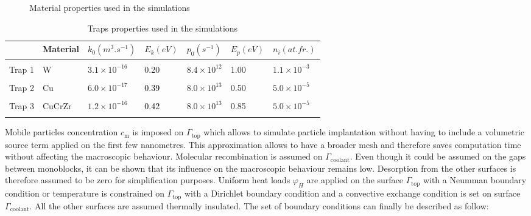 \begin{figure} [h!]
\begin{subfigure}{0.5\linewidth}
        \label{fig:D coeff}
    \end{subfigure}
    \caption{Material properties used in the simulations \cite{reiter_compilation_1996, serra_hydrogen_1998, fernandez_hydrogen_2015}}
    \label{fig:properties}
\end{figure}

\begin{table} [ht]
    \centering
    \begin{tabular}{L{1.5cm} L{1.5cm} R{1.6cm} R{1.1cm} R{1.6cm} R{1.1cm} R{2cm}}
         & Material & $k_0 (\si{m^3.s^{-1}})$ &  $E_k (\si{eV})$ & $p_0 (\si{s^{-1}})$ & $E_p (\si{eV})$ & $n_i (\si{at.fr.})$ \\
        \hline
        \\
       Trap 1 & W & $3.1 \times 10^{-16}$ & 0.20 & $8.4 \times 10^{12}$& 1.00 & $1.1 \times 10^{-3}$ \\
        \\
        Trap 2 & Cu & $6.0 \times 10^{-17}$ & \textcolor{black}{0.39} & $8.0 \times 10^{13}$ & 0.50 &$5.0 \times 10^{-5}$\\
        \\
        Trap 3 & CuCrZr & $1.2 \times 10^{-16}$ & \textcolor{black}{0.42} & $8.0 \times 10^{13}$ & 0.85 &$5.0 \times 10^{-5}$\\
        \\
    \end{tabular}
    \caption{Traps properties used in the simulations \cite{hodille_macroscopic_2015, dolan_assessment_1994}}
    \label{tab:traps monoblock}
\end{table}


Mobile particles concentration $c_\mathrm{m}$ is imposed on $\Gamma_\mathrm{top}$ which allows to simulate particle implantation without having to include a volumetric source term applied on the first few nanometres.
This approximation allows to have a broader mesh and therefore saves computation time without affecting the macroscopic behaviour.
Molecular recombination is assumed on $\Gamma_\mathrm{coolant}$.
Even though it could be assumed on the gaps between monoblocks, it can be shown that its influence on the macroscopic behaviour remains low.
Desorption from the other surfaces is therefore assumed to be zero for simplification purposes.
\textcolor{black}{Uniform} heat loads $\varphi_H$ are applied on the surface $\Gamma_\mathrm{top}$ with a Neumman boundary condition or temperature is constrained on $\Gamma_\mathrm{top}$ with a Dirichlet boundary condition and a convective exchange condition is set on surface $\Gamma_\mathrm{coolant}$.
All the other surfaces are assumed thermally insulated.
The set of boundary conditions can finally be described as follow:

